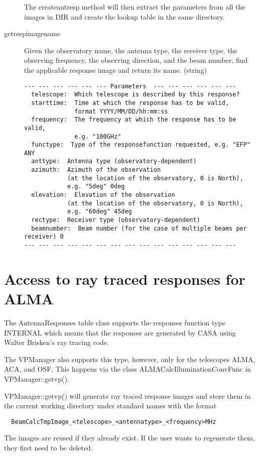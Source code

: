 \documentclass[12pt]{article}
\begin{document}
\begin{description}
The createantresp method will then extract the parameters from all the images in DIR
and create the lookup table in the same directory.

  \item[getrespimagename]
    Given the observatory name, the antenna type, the receiver type, the observing frequency, the
    observing direction, and the beam number, find the applicable response image and return its name.
    (string)

{\small
    \begin{verbatim}
--- --- --- --- --- --- Parameters  --- --- --- --- --- ---
  telescope:  Which telescope is described by this response? 
  starttime:  Time at which the response has to be valid, 
              format YYYY/MM/DD/hh:mm:ss 
  frequency:  The frequency at which the response has to be valid, 
              e.g. "100GHz" 
  functype:  Type of the responsefunction requested, e.g. "EFP" ANY 
  anttype:  Antenna type (observatory-dependent) 
  azimuth:  Azimuth of the observation 
            (at the location of the observatory, 0 is North), 
            e.g. "5deg" 0deg 
  elevation:  Elevation of the observation 
            (at the location of the observatory, 0 is North), 
            e.g. "60deg" 45deg 
  rectype:  Receiver type (observatory-dependent) 
  beamnumber:  Beam number (for the case of multiple beams per receiver) 0 
--- --- --- --- --- --- --- --- --- --- --- --- --- --- ---
\end{verbatim} 
} 

\end{description}

\section{Access to ray traced responses for ALMA}
\label{secrt}

The AntennaResponses table class supports the responses function type INTERNAL which
means that the responses are generated by CASA using Walter Brisken's ray tracing code.

The VPManager also supports this type, however, only for the telescopes ALMA, ACA, and OSF.
This happens via the class ALMACalcIlluminationConvFunc in VPManager::getvp().

VPManager::getvp() will generate ray traced response images and store them in the current
working directory under standard names with the format
\begin{verbatim}
  BeamCalcTmpImage_<telescope>_<antennatype>_<frequency>MHz
\end{verbatim}
The images are reused if they already exist.
If the user wants to regenerate them, they first need to be deleted.
\end{document}
